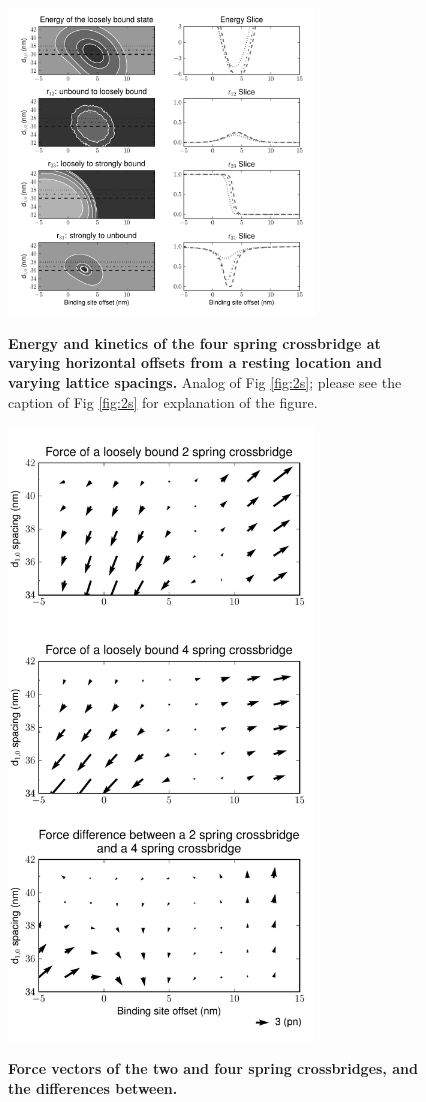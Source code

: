 \documentclass[]{article}
\begin{document}
\begin{figure}[p]
    \begin{center}
    \includegraphics[width=3.2in]{../imgs/Figure3.pdf}
    \label{fig:4s}
    \caption{
        \textbf{Energy and kinetics of the four spring crossbridge at varying horizontal offsets from a resting location and varying lattice spacings.}
        Analog of Fig \ref{fig:2s}; please see the caption of Fig \ref{fig:2s} for explanation of the figure.
    }
    \end{center}
\end{figure}

\begin{figure}[p]
    \begin{center}
    \includegraphics[width=3.2in]{../imgs/Figure4.pdf}
    \label{fig:force}
    \caption{
        \textbf{Force vectors of the two and four spring crossbridges, and the differences between.}        
    }
    \end{center}
\end{figure}
\end{document}
